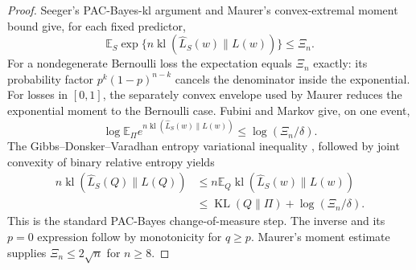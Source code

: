 \begin{proof}
Seeger's PAC-Bayes-kl argument and Maurer's convex-extremal moment bound
\cite{seeger2002pacbayes,maurer2004note} give, for each fixed predictor,
\begin{equation}
 \mathbb E_S\exp\{n\operatorname{kl}(\widehat L_S(w)\|L(w))\}
 \le\Xi_n.
\end{equation}
For a nondegenerate Bernoulli loss the expectation equals $\Xi_n$ exactly:
its probability factor $p^k(1-p)^{n-k}$ cancels the denominator inside the
exponential. For losses in $[0,1]$, the separately convex envelope used by
Maurer reduces the exponential moment to the Bernoulli case.
Fubini and Markov give, on one event,
\begin{equation}
 \log\mathbb E_\Pi e^{n\operatorname{kl}(\widehat L_S(w)\|L(w))}
                        \le\log(\Xi_n/\delta).
\end{equation}
The Gibbs--Donsker--Varadhan entropy variational inequality
\cite{donsker1975asymptotic}, followed by joint convexity of binary
relative entropy yields
\begin{align}
 n\operatorname{kl}(\widehat L_S(Q)\|L(Q))
 &\le n\mathbb E_Q\operatorname{kl}(\widehat L_S(w)\|L(w))\\
 &\le\operatorname{KL}(Q\|\Pi)+\log(\Xi_n/\delta).
\end{align}
This is the standard PAC-Bayes change-of-measure step.
The inverse and its $p=0$ expression follow by monotonicity for $q\ge p$.
Maurer's moment estimate supplies $\Xi_n\le2\sqrt n$ for $n\ge8$.
\end{proof}
